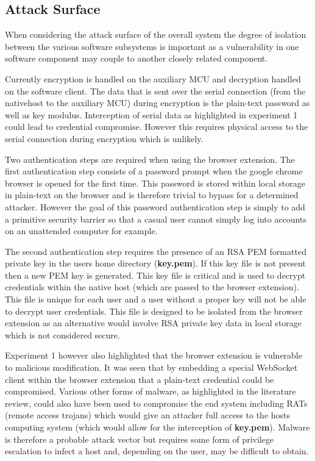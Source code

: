 \subsection{Attack Surface}

When considering the attack surface of the overall system the degree of isolation between the various software subsystems is important as a vulnerability in one software component may couple to another closely related component. 

Currently encryption is handled on the auxiliary MCU and decryption handled on the software client. The data that is sent over the serial connection (from the nativehost to the auxiliary MCU) during encryption is the plain-text password as well as key modulus. Interception of serial data as highlighted in experiment 1 could lead to credential compromise. However this requires physical access to the serial connection during encryption which is unlikely.

Two authentication steps are required when using the browser extension. The first authentication step consists of a password prompt when the google chrome browser is opened for the first time. This password is stored within local storage in plain-text on the browser and is therefore trivial to bypass for a determined attacker. However the goal of this password authentication step is simply to add a primitive security barrier so that a casual user cannot simply log into accounts on an unattended computer for example. 

The second authentication step requires the presence of an RSA PEM formatted private key in the users home directory (\textbf{key.pem}). If this key file is not present then a new PEM key is generated. This key file is critical and is used to decrypt credentials within the native host (which are passed to the browser extension). This file is unique for each user and a user without a proper key will not be able to decrypt user credentials. This file is designed to be isolated from the browser extension as an alternative would involve RSA private key data in local storage which is not considered secure.

Experiment 1 however also highlighted that the browser extension is vulnerable to malicious modification. It was seen that by embedding a special WebSocket client within the browser extension that a plain-text credential could be compromised. Various other forms of malware, as highlighted in the literature review, could also have been used to compromise the end system including RATs (remote access trojans) which would give an attacker full access to the hosts computing system (which would allow for the interception of \textbf{key.pem}). Malware is therefore a probable attack vector but requires some form of privilege escalation to infect a host and, depending on the user, may be difficult to obtain. 

